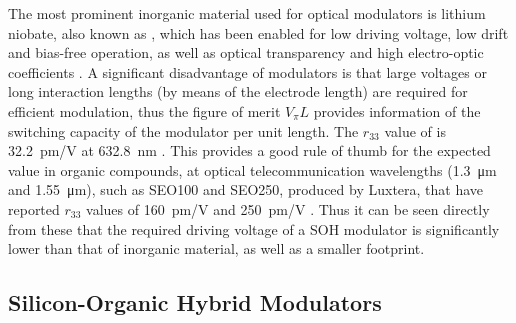 The most prominent inorganic material used for optical modulators is lithium niobate, also known as , which has been enabled for low driving voltage, low drift and bias-free operation, as well as optical transparency and high electro-optic coefficients \cite{WootenLiNBo300}. A significant disadvantage of  modulators is that large voltages or long interaction lengths (by means of the electrode length) are required for efficient modulation, thus the figure of merit $V_\pi L$ provides information of the switching capacity of the modulator per unit length. The $r_{33}$ value of  is \SI{32.2}{\pico\meter/\volt} at \SI{632.8}{\nano\meter}  \cite{BosshardOrgaNLO95}. This provides a good rule of thumb for the expected value in organic compounds, at optical telecommunication wavelengths (\SI{1.3}{\micro\meter} and \SI{1.55}{\micro\meter}), such as SEO100 and SEO250, produced by Luxtera, that have reported $r_{33}$ values of \SI{160}{\pico\meter/\volt}  and \SI{250}{\pico\meter/\volt} \cite{HerreraSEO12} \cite{JouaneSEO14}. Thus it can be seen directly from these that the required driving voltage of a SOH modulator is significantly lower than that of inorganic material, as well as a smaller footprint.





\subsection{Silicon-Organic Hybrid Modulators}

